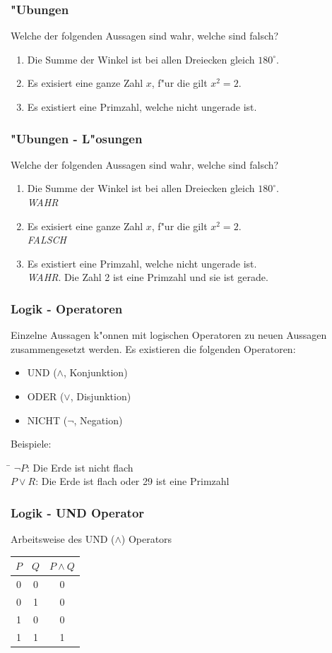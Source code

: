\documentclass{beamer}
\begin{document}
\frame
{
	\frametitle{"Ubungen}
	Welche der folgenden Aussagen sind wahr, welche sind falsch?
	\begin{enumerate}
	\item Die Summe der Winkel ist bei allen Dreiecken gleich $180^\circ$.
	\item Es exisiert eine ganze Zahl $x$, f"ur die gilt $x^2 = 2$.
	\item Es existiert eine Primzahl, welche nicht ungerade ist.
	\end{enumerate}
}

\frame
{
	\frametitle{"Ubungen - L"osungen}
	Welche der folgenden Aussagen sind wahr, welche sind falsch?
	\begin{enumerate}
	\item Die Summe der Winkel ist bei allen Dreiecken gleich $180^\circ$.\\
	\emph{WAHR}
	\item Es exisiert eine ganze Zahl $x$, f"ur die gilt $x^2 = 2$.\\
	\emph{FALSCH}
	\item Es existiert eine Primzahl, welche nicht ungerade ist.\\
	\emph{WAHR}. Die Zahl 2 ist eine Primzahl und sie ist gerade.
	\end{enumerate}
}

\frame
{
	\frametitle{Logik - Operatoren}
	Einzelne Aussagen k"onnen mit logischen Operatoren zu neuen Aussagen zusammengesetzt
	werden. Es existieren die folgenden Operatoren:
	\begin{itemize}
	\item UND ($\land$, Konjunktion)
	\item ODER ($\lor$, Disjunktion)
	\item NICHT ($\lnot$, Negation)
	\end{itemize}
	\vspace{3mm}
	Beispiele:\\
	\begin{tabbing}
	\hspace{2cm} \= \kill
	$\lnot P$: \> Die Erde ist nicht flach\\
	$P \lor R$: \> Die Erde ist flach oder 29 ist eine Primzahl
	\end{tabbing}
}

\frame
{
	\frametitle{Logik - UND Operator}
	Arbeitsweise des UND ($\land$) Operators\\
	\vspace{3mm}
	\begin{tabular}{c|c|c}
	$P$ & $Q$ & $P \land Q$ \\
	\hline
	0 & 0 & 0 \\
	0 & 1 & 0 \\
	1 & 0 & 0 \\
	1 & 1 & 1
	\end{tabular}
}
\end{document}
